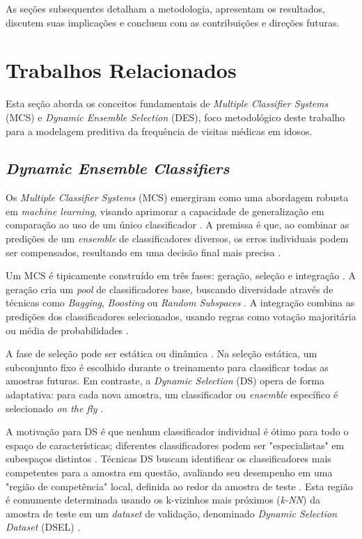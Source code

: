 \documentclass[12pt]{article}
\begin{document}
As seções subsequentes detalham a metodologia, apresentam os resultados, discutem suas implicações e concluem com as contribuições e direções futuras.

\section{Trabalhos Relacionados}

Esta seção aborda os conceitos fundamentais de \textit{Multiple Classifier Systems} (MCS) e \textit{Dynamic Ensemble Selection} (DES), foco metodológico deste trabalho para a modelagem preditiva da frequência de visitas médicas em idosos.

\subsection{\textit{Dynamic Ensemble Classifiers}} 
Os \textit{Multiple Classifier Systems} (MCS) emergiram como uma abordagem robusta em \textit{machine learning}, visando aprimorar a capacidade de generalização em comparação ao uso de um único classificador \cite{Javed2024}. A premissa é que, ao combinar as predições de um \textit{ensemble} de classificadores diversos, os erros individuais podem ser compensados, resultando em uma decisão final mais precisa \cite{KO20081718}.

Um MCS é tipicamente construído em três fases: geração, seleção e integração \cite{Cruz_2015}. A geração cria um \textit{pool} de classificadores base, buscando diversidade através de técnicas como \textit{Bagging}, \textit{Boosting} ou \textit{Random Subspaces} \cite{KO20081718}. A integração combina as predições dos classificadores selecionados, usando regras como votação majoritária ou média de probabilidades \cite{Cruz_2015}.

A fase de seleção pode ser estática ou dinâmica \cite{Cruz_2015, KO20081718}. Na seleção estática, um subconjunto fixo é escolhido durante o treinamento para classificar todas as amostras futuras. Em contraste, a \textit{Dynamic Selection} (DS) opera de forma adaptativa: para cada nova amostra, um classificador ou \textit{ensemble} específico é selecionado \textit{on the fly} \cite{ICPRAI2018SI}.

A motivação para DS é que nenhum classificador individual é ótimo para todo o espaço de características; diferentes classificadores podem ser "especialistas" em subespaços distintos \cite{Cruz_2015, ICPRAI2018SI}. Técnicas DS buscam identificar os classificadores mais competentes para a amostra em questão, avaliando seu desempenho em uma "região de competência" local, definida ao redor da amostra de teste \cite{ICPRAI2018SI}. Esta região é comumente determinada usando os k-vizinhos mais próximos (\textit{k-NN}) da amostra de teste em um \textit{dataset} de validação, denominado \textit{Dynamic Selection Dataset} (DSEL) \cite{ICPRAI2018SI}.
\end{document}
